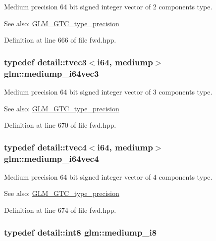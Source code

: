 Medium precision 64 bit signed integer vector of 2 components type. \begin{Desc}
\item[See also:]\hyperlink{group__gtc__type__precision}{GLM\_\-GTC\_\-type\_\-precision} \end{Desc}


Definition at line 666 of file fwd.hpp.\hypertarget{group__gtc__type__precision_ge1aa82d2b9a62a87648306205dfe69ab}{
\subsubsection[mediump\_\-i64vec3]{\setlength{\rightskip}{0pt plus 5cm}typedef detail::tvec3$<$i64, mediump$>$ {\bf glm::mediump\_\-i64vec3}}}
\label{group__gtc__type__precision_ge1aa82d2b9a62a87648306205dfe69ab}


Medium precision 64 bit signed integer vector of 3 components type. \begin{Desc}
\item[See also:]\hyperlink{group__gtc__type__precision}{GLM\_\-GTC\_\-type\_\-precision} \end{Desc}


Definition at line 670 of file fwd.hpp.\hypertarget{group__gtc__type__precision_gb4db11ebb425fa18fe5d15d455c360a3}{
\subsubsection[mediump\_\-i64vec4]{\setlength{\rightskip}{0pt plus 5cm}typedef detail::tvec4$<$i64, mediump$>$ {\bf glm::mediump\_\-i64vec4}}}
\label{group__gtc__type__precision_gb4db11ebb425fa18fe5d15d455c360a3}


Medium precision 64 bit signed integer vector of 4 components type. \begin{Desc}
\item[See also:]\hyperlink{group__gtc__type__precision}{GLM\_\-GTC\_\-type\_\-precision} \end{Desc}


Definition at line 674 of file fwd.hpp.\hypertarget{group__gtc__type__precision_g28a8b5fd51072680bb55178c17cc7411}{
\subsubsection[mediump\_\-i8]{\setlength{\rightskip}{0pt plus 5cm}typedef detail::int8 {\bf glm::mediump\_\-i8}}}
\label{group__gtc__type__precision_g28a8b5fd51072680bb55178c17cc7411}


